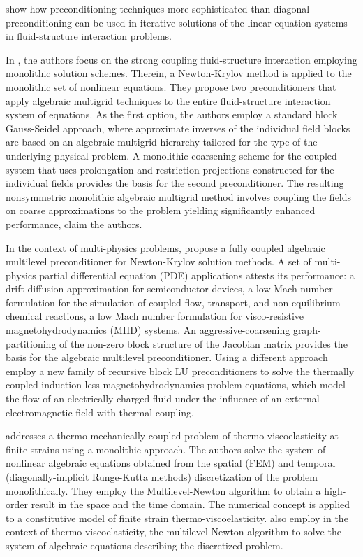 \cite{tezduyar2006space} show how preconditioning techniques more sophisticated than diagonal preconditioning can be used in iterative solutions of the linear equation systems in fluid-structure interaction problems.

In \cite{gee_truly_2011}, the authors focus on the strong coupling fluid-structure interaction employing monolithic solution schemes.
Therein, a Newton-Krylov method is applied to the monolithic set of nonlinear equations.
They propose two preconditioners that apply algebraic multigrid techniques to the entire fluid-structure interaction system of equations.
As the first option, the authors employ a standard block Gauss-Seidel approach, where approximate inverses of the individual field blocks are based on an algebraic multigrid hierarchy tailored for the type of the underlying physical problem.
A monolithic coarsening scheme for the coupled system that uses prolongation and restriction projections constructed for the individual fields provides the basis for the second preconditioner.
The resulting nonsymmetric monolithic algebraic multigrid method involves coupling the fields on coarse approximations to the problem yielding significantly enhanced performance, claim the authors.

In the context of multi-physics problems, \cite{https://doi.org/10.1002/fld.2402} propose a fully coupled algebraic multilevel preconditioner for Newton-Krylov solution methods.
A set of multi-physics partial differential equation (PDE) applications attests its performance: a drift-diffusion approximation for semiconductor devices,
a low Mach number formulation for the simulation of coupled flow, transport, and non-equilibrium chemical reactions,
a low Mach number formulation for visco-resistive magnetohydrodynamics (MHD) systems.
An aggressive-coarsening graph-partitioning of the non-zero block structure of the Jacobian matrix provides the basis for the algebraic multilevel preconditioner.
Using a different approach \cite{badia_block_2014} employ a new family of recursive block LU preconditioners to solve the thermally coupled induction less magnetohydrodynamics problem equations, which model the flow of an electrically charged fluid under the influence of an external electromagnetic field with thermal coupling.

\cite{netz_high-order_2013} addresses a thermo-mechanically coupled problem of thermo-viscoelasticity at finite strains using a monolithic approach.
The authors solve the system of nonlinear algebraic equations obtained from the spatial (FEM) and temporal (diagonally-implicit Runge-Kutta methods) discretization of the problem monolithically.
They employ the Multilevel-Newton algorithm to obtain a high-order result in the space and the time domain.
The numerical concept is applied to a constitutive model of finite strain thermo-viscoelasticity.
\cite{rothe_monolithic_2015} also employ in the context of thermo-viscoelasticity, the multilevel Newton algorithm to solve the system of algebraic equations describing the discretized problem.


